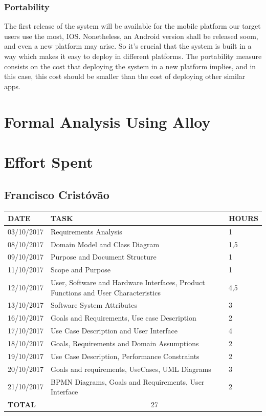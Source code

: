 \documentclass[12pt]{article}
\begin{document}
\subsubsection{Portability}
The first release of the system will be available for the mobile platform our target users use the most, IOS. Nonetheless, an Android version shall be released soom, and even a new platform may arise. So it's crucial that the system is built in a way which makes it easy to deploy in different platforms. The portability measure consists on the cost that deploying the system in a new platform implies, and in this case, this cost should be smaller than the cost of deploying other similar apps.

\section{Formal Analysis Using Alloy}

\section{Effort Spent}
\subsection{Francisco Cristóvão}

\begin{center}
\begin{tabular}{ |p{}|p{}|p{}| } 
 \hline
 \textbf{DATE} & \textbf{TASK} & \textbf{HOURS} \\ 
  \hline
 03/10/2017 & Requirements Analysis & 1 \\ 
  \hline
 08/10/2017 & Domain Model and Class Diagram & 1,5 \\ 
  \hline
  09/10/2017 & Purpose and Document Structure & 1 \\ 
  \hline
  11/10/2017 & Scope and Purpose & 1 \\ 
  \hline
  12/10/2017 & User, Software and Hardware Interfaces, Product Functions and User Characteristics & 4,5 \\ 
  \hline
  13/10/2017 & Software System Attributes & 3 \\ 
  \hline
  16/10/2017 & Goals and Requirements, Use case Description & 2 \\ 
  \hline
  17/10/2017 & Use Case Description and User Interface & 4 \\ 
  \hline
  18/10/2017 & Goals, Requirements and Domain Assumptions & 2 \\ 
  \hline
  19/10/2017 & Use Case Description, Performance Constraints & 2 \\ 
  \hline
  20/10/2017 & Goals and requirements, UseCases, UML Diagrams & 3 \\ 
  \hline
  21/10/2017 & BPMN Diagrams, Goals and Requirements, User Interface & 2 \\ 
  \hline
  \textbf{TOTAL} & \multicolumn{2}{c|}{27} \\ 
  \hline
\end{tabular}
\end{center}
\end{document}
